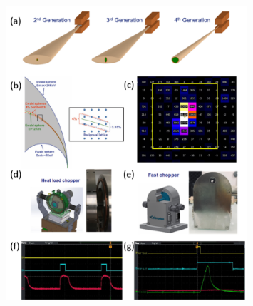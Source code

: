 \begin{figure}[H] 
    \centering
        \noindent \includegraphics[width=0.8\textwidth]{images/T-Cer/ID29_beamline.pdf}

\end{figure}
